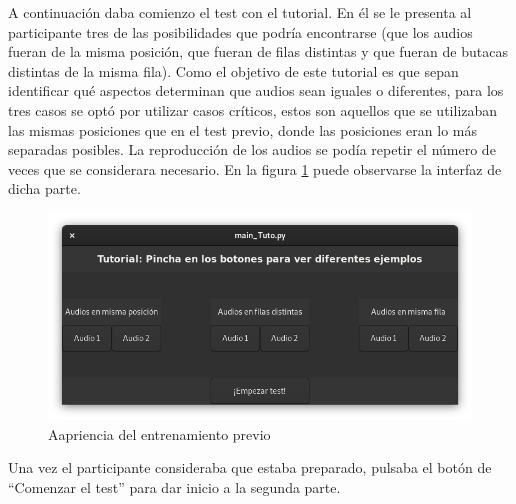 \documentclass[11pt,a4paper,twoside]{book}
\begin{document}
                A continuación daba comienzo el test con el tutorial. En él se le presenta al participante tres de las posibilidades que podría encontrarse (que los audios fueran de la misma posición, que fueran de filas distintas y que fueran de butacas distintas de la misma fila). Como el objetivo de este tutorial es que sepan identificar qué aspectos determinan que audios sean iguales o diferentes, para los tres casos se optó por utilizar casos críticos, estos son aquellos que se utilizaban las mismas posiciones que en el test previo, donde las posiciones eran lo más separadas posibles. La reproducción de los audios se podía repetir el número de veces que se considerara necesario. En la figura \ref{fig:interfazTutorial} puede observarse la interfaz de dicha parte.
                
                \begin{figure}
                    \includegraphics[scale=0.6]{../imagenes/interfaz_tutorial.png}
			        \centering
			        \caption{Aapriencia del entrenamiento previo}
			        \label{fig:interfazTutorial}
                \end{figure}
                
                Una vez el participante consideraba que estaba preparado, pulsaba el botón de ``Comenzar el test'' para dar inicio a la segunda parte.
                
\end{document}
